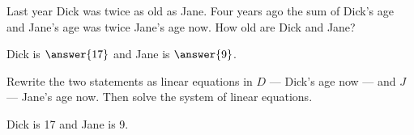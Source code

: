 \documentclass{ximera}
\begin{document}
\begin{exercise} \label{c2.1.10}
Last year Dick was twice as old as Jane.  Four years ago the
sum of Dick's age and Jane's age was twice Jane's age now.  How
old are Dick and Jane?
\begin{prompt}
  Dick is $\answer{17}$ and Jane is $\answer{9}$.
\end{prompt}
\begin{hint}
  Rewrite the two statements
  as linear equations in $D$ --- Dick's age now --- and $J$ ---
  Jane's age now.  Then solve the system of linear equations.
\end{hint}

\begin{solution}

Dick is 17 and Jane is 9.


\end{solution}
\end{exercise}
\end{document}
